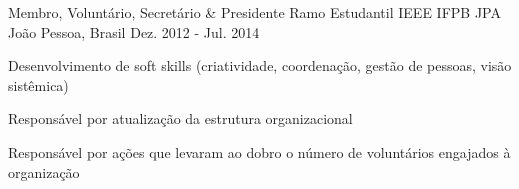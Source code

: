 \begin{cventries}
\cventry
  {Membro, Voluntário, Secretário \& Presidente} %
  {Ramo Estudantil IEEE IFPB JPA} %
  {João Pessoa, Brasil} %
  {Dez. 2012 - Jul. 2014} %
  {
    \begin{cvitems} %
      \item{Desenvolvimento de soft skills (criatividade, coordenação, gestão de pessoas, visão sistêmica)}
      \item{Responsável por atualização da estrutura organizacional}
      \item{Responsável por ações que levaram ao dobro o número de voluntários engajados à organização}
    \end{cvitems}
  }
%
\end{cventries}
